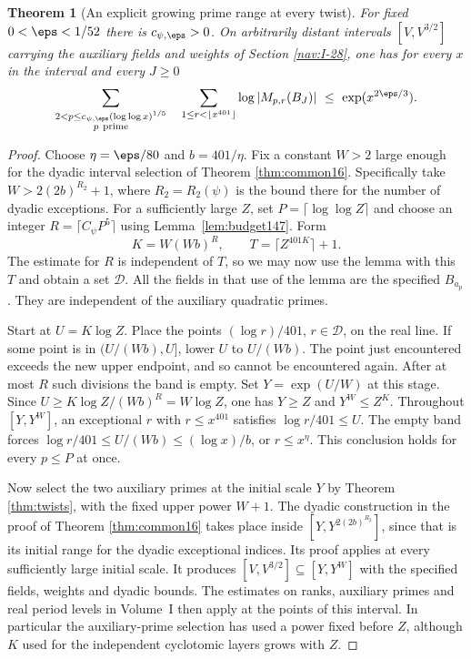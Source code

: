\documentclass[a4paper,11pt]{article}
\newtheorem{theorem}[proposition]{Theorem}
\theoremstyle{definition}
\theoremstyle{remark}
\numberwithin{equation}{section}
\begin{document}
\begin{theorem}[An explicit growing prime range at every twist]
\label{thm:log147}
For fixed \(0<\eps<1/52\) there is \(c_{\psi,\eps}>0\).
On arbitrarily distant intervals \([V,V^{3/2}]\) carrying the
auxiliary fields and weights of Section \ref{nav:I-28}, one has
for every \(x\) in the interval and every \(J\ge0\)
\begin{equation}
 \sum_{\substack{2<p\le c_{\psi,\eps}(\log\log x)^{1/5}\\
                  p\ {\rm prime}}}
       \quad\sum_{1\le r<\lfloor x^{401}\rfloor}
                \log |M_{p,r}(B_J)|
                  \ \le\ \exp(x^{2\eps/3}).
 \label{eq:log147}
\end{equation}
\end{theorem}
\begin{proof}
Choose \(\eta=\eps/80\) and \(b=401/\eta\). Fix a constant
\(W>2\) large enough for the dyadic interval selection of
Theorem \ref{thm:common16}.
Specifically take \(W>2(2b)^{R_2}+1\), where \(R_2=R_2(\psi)\)
is the bound there for the number of dyadic exceptions.
For a sufficiently large \(Z\), set \(P=\lceil\log\log Z\rceil\)
and choose an integer \(R=\lceil C_\psi P^5\rceil\) using
Lemma~\ref{lem:budget147}. Form
\[
     K=W(Wb)^R,\qquad T=\lceil Z^{401K}\rceil+1 .
\]
The estimate for \(R\) is independent of \(T\), so we may now
use the lemma with this \(T\) and obtain a set \(\mathcal D\).
All the fields in that use of the lemma are the specified
\(B_{a_p}\). They are independent of the auxiliary quadratic
primes.

Start at \(U=K\log Z\). Place the points \((\log r)/401\),
\(r\in\mathcal D\), on the real line. If some point is in
\((U/(Wb),U]\), lower \(U\) to \(U/(Wb)\). The point just
encountered exceeds the new upper endpoint, and so cannot be
encountered again. After at most \(R\) such divisions the band
is empty. Set \(Y=\exp(U/W)\) at this stage. Since
\(U\ge K\log Z/(Wb)^R=W\log Z\), one has \(Y\ge Z\) and
\(Y^W\le Z^K\). Throughout \([Y,Y^W]\), an exceptional \(r\)
with \(r\le x^{401}\) satisfies \(\log r/401\le U\). The empty
band forces \(\log r/401\le U/(Wb)\le(\log x)/b\), or
\(r\le x^\eta\). This conclusion holds for every \(p\le P\)
at once.

Now select the two auxiliary primes at the initial scale \(Y\)
by Theorem \ref{thm:twists}, with the fixed upper power \(W+1\).
The dyadic construction in the proof of Theorem \ref{thm:common16}
takes place inside \([Y,Y^{2(2b)^{R_2}}]\), since that is its
initial range for the dyadic exceptional indices. Its proof
applies at every sufficiently large initial scale. It produces
\([V,V^{3/2}]\subseteq[Y,Y^W]\) with the specified fields,
weights and dyadic bounds. The estimates on ranks, auxiliary
primes and real period levels in Volume~I then apply at the
points of this interval. In particular the auxiliary-prime
selection has used a power fixed before \(Z\), although \(K\)
used for the independent cyclotomic layers grows with \(Z\).


\end{proof}
\end{document}
